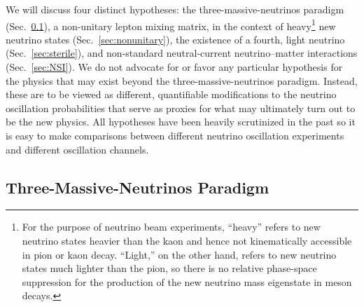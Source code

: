 \documentclass[aps,prd,onecolumn,nofootinbib,superscriptaddress, 11pt]{revtex4}
\begin{document}
We will discuss four distinct hypotheses: the three-massive-neutrinos paradigm (Sec.~\ref{sec:3Nu}), a non-unitary lepton mixing matrix, in the context of heavy\footnote{For the purpose of neutrino beam experiments, ``heavy'' refers to new neutrino states heavier than the kaon and hence not kinematically accessible in pion or kaon decay. ``Light,'' on the other hand, refers to new neutrino states much lighter than the pion, so there is no relative phase-space suppression for the production of the new neutrino mass eigenstate in meson decays.} new neutrino states (Sec.~\ref{sec:nonunitary}), the existence of a fourth, light neutrino (Sec.~\ref{sec:sterile}), and non-standard neutral-current neutrino--matter interactions (Sec.~\ref{sec:NSI}). We do not advocate for or favor any particular hypothesis for the physics that may exist beyond the three-massive-neutrinos paradigm. Instead, these are to be viewed as different, quantifiable modifications to the neutrino oscillation probabilities that serve as proxies for what may ultimately turn out to be the new physics. All hypotheses have been heavily scrutinized in the past so it is easy to make comparisons between different neutrino oscillation experiments and different oscillation channels.         


\subsection{Three-Massive-Neutrinos Paradigm}
\label{sec:3Nu}
\end{document}
